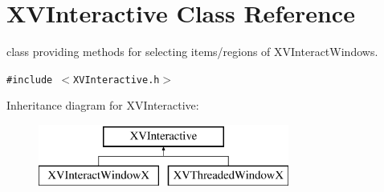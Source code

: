 \hypertarget{class_XVInteractive}{
\section{XVInteractive  Class Reference}
\label{XVInteractive}
}
class providing methods for selecting items/regions of XVInteract\-Windows. 


{\tt \#include $<$XVInteractive.h$>$}

Inheritance diagram for XVInteractive:\begin{figure}[H]
\begin{center}
\leavevmode
\includegraphics[height=2cm]{class_XVInteractive}
\end{center}
\end{figure}
